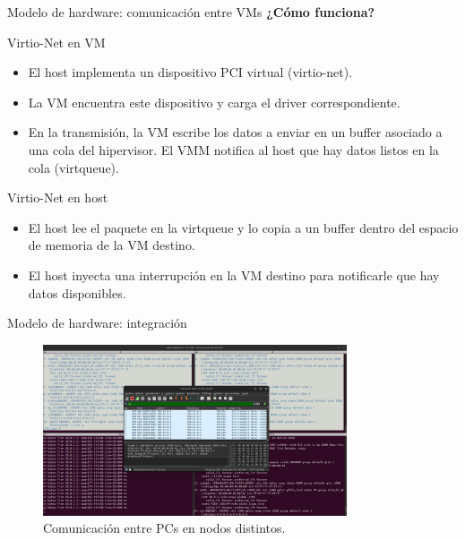 \documentclass[serif, aspectratio=169]{beamer}
\begin{document}
\begin{frame}{Modelo de hardware: comunicación entre VMs}
\textbf{¿Cómo funciona?}
\begin{block}{\small Virtio-Net en VM}
\begin{itemize}
    \item El host implementa un dispositivo PCI virtual (virtio-net).
    \item La VM encuentra este dispositivo y carga el driver correspondiente.
    \item En la transmisión, la VM escribe los datos a enviar en un buffer asociado a una cola del hipervisor. El VMM notifica al host que hay datos listos en la cola (virtqueue).
\end{itemize}
\end{block}

\begin{block}{\small Virtio-Net en host}
\begin{itemize}
    \item El host lee el paquete en la virtqueue y lo copia a un buffer dentro del espacio de memoria de la VM destino.
    \item El host inyecta una interrupción en la VM destino para notificarle que hay datos disponibles.
\end{itemize}
\end{block}

\end{frame}



\begin{frame}{Modelo de hardware: integración}
\begin{figure}
    \centering
    \includegraphics[width=0.8\textwidth]{images/pingAB.png}
    \caption{Comunicación entre PCs en nodos distintos.}
\end{figure}
\end{frame}
\end{document}
